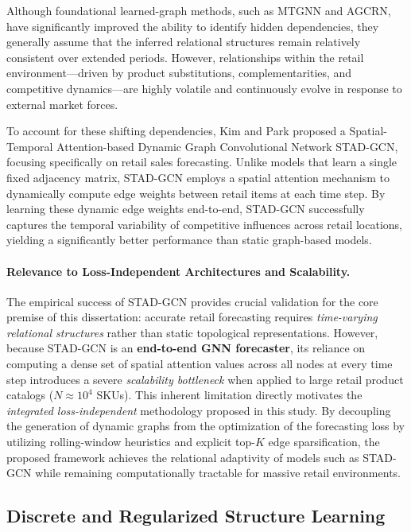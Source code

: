 Although foundational learned-graph methods, such as \ac{MTGNN} and AGCRN, have significantly improved the ability to identify hidden dependencies, they generally assume that the inferred relational structures remain relatively consistent over extended periods. However, relationships within the retail environment—driven by product substitutions, complementarities, and competitive dynamics—are highly volatile and continuously evolve in response to external market forces.

To account for these shifting dependencies, Kim and Park \cite{kim2024stadgcn} proposed a Spatial-Temporal Attention-based Dynamic Graph Convolutional Network \ac{STAD-GCN}, focusing specifically on retail sales forecasting. Unlike models that learn a single fixed adjacency matrix,  \ac{STAD-GCN} employs a spatial attention mechanism to dynamically compute edge weights between retail items at each time step. By learning these dynamic edge weights end-to-end, \ac{STAD-GCN} successfully captures the temporal variability of competitive influences across retail locations, yielding a significantly better performance than static graph-based models.

\paragraph{Relevance to Loss-Independent Architectures and Scalability.}
The empirical success of  \ac{STAD-GCN} provides crucial validation for the core premise of this dissertation: accurate retail forecasting requires \emph{time-varying relational structures} rather than static topological representations. However, because  \ac{STAD-GCN} is an \textbf{end-to-end GNN forecaster}, its reliance on computing a dense set of spatial attention values across all nodes at every time step introduces a severe \textit{scalability bottleneck} when applied to large retail product catalogs ($N \approx 10^4$ \ac{SKUs}). This inherent limitation directly motivates the \emph{integrated loss-independent} methodology proposed in this study. By decoupling the generation of dynamic graphs from the optimization of the forecasting loss by utilizing rolling-window heuristics and explicit top-$K$ edge sparsification, the proposed framework achieves the relational adaptivity of models such as  \ac{STAD-GCN} while remaining computationally tractable for massive retail environments.

\subsection{Discrete and Regularized Structure Learning}
\label{sec:pathb-discrete-regularized}

